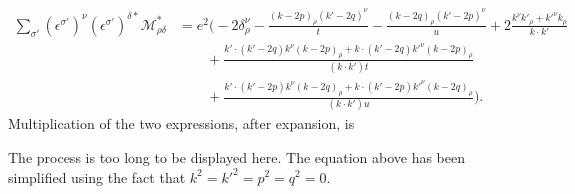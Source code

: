 \documentclass[hyperref, a4paper]{article}
\begin{document}
\begin{itemize}
\[\begin{aligned}
        \sum_{\sigma'} (\epsilon^{\sigma'})^\nu (\epsilon^{\sigma'})^{\delta *} \mathcal{M}_{\rho \delta}^* &=
        e^2 \Big( - 2 \delta_\rho^\nu - \frac{(k-2p)_\rho (k'-2q)^\nu}{t} - \frac{(k-2q)_\rho (k'-2p)^\nu}{u} 
        + 2 \frac{k^\nu k'_\rho + k'^\nu k_\rho}{k \cdot k'} \\
        &\quad \quad + \frac{k' \cdot (k'-2q) k^\nu (k-2p)_\rho + k \cdot (k' - 2q) k'^\nu (k-2p)_\rho}{(k \cdot k') t} \\
        &\quad \quad + \frac{k' \cdot (k'-2p) k^\nu (k-2q)_\rho + k \cdot (k' - 2p) k'^\nu (k-2q)_\rho}{(k \cdot k') u} \Big).
    \end{aligned}
\]
Multiplication of the two expressions, after expansion, is 

The process is too long to be displayed here. The equation above has been simplified using the fact 
that $k^2 = k'^2 = p^2 = q^2 = 0$.

\end{itemize}
\end{document}
